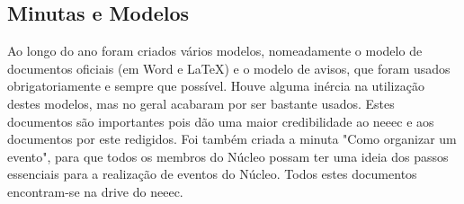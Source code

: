 
\subsection{Minutas e Modelos}

Ao longo do ano foram criados vários modelos, nomeadamente o modelo de documentos oficiais (em Word e LaTeX) e o modelo de avisos, que foram usados obrigatoriamente e sempre que possível. Houve alguma inércia na utilização destes modelos, mas no geral acabaram por ser bastante usados. Estes documentos são importantes pois dão uma maior credibilidade ao \acrshort{neeec} e aos documentos por este redigidos. Foi também criada a minuta "Como organizar um evento", para que todos os membros do Núcleo possam ter uma ideia dos passos essenciais para a realização de eventos do Núcleo. Todos estes documentos encontram-se na drive do \acrshort{neeec}.